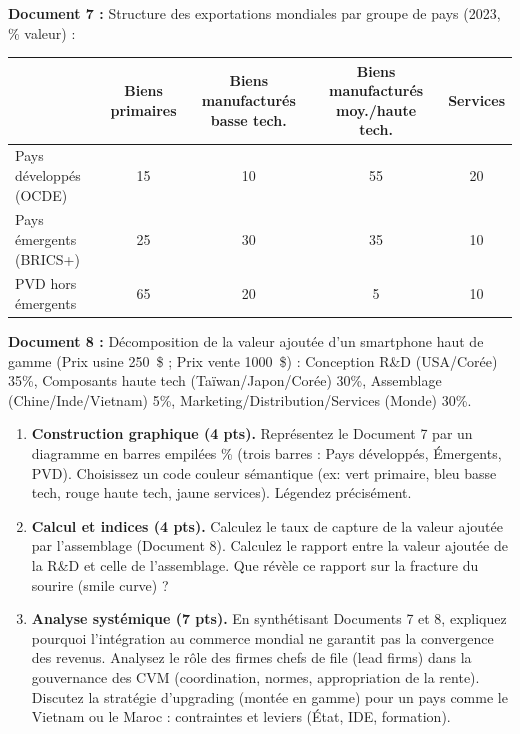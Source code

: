 \documentclass[11pt]{article}
\begin{document}
\begin{exercice}
\textbf{Document 7 :} Structure des exportations mondiales par groupe de pays (2023, \% valeur) :\\
\begin{tabular}{lcccc}
\hline
 & Biens primaires & Biens manufacturés basse tech. & Biens manufacturés moy./haute tech. & Services \\
\hline
Pays développés (OCDE) & 15 & 10 & 55 & 20 \\
Pays émergents (BRICS+) & 25 & 30 & 35 & 10 \\
PVD hors émergents & 65 & 20 & 5 & 10 \\
\hline
\end{tabular}
\textbf{Document 8 :} Décomposition de la valeur ajoutée d'un smartphone haut de gamme (Prix usine \SI{250}{\$} ; Prix vente \SI{1000}{\$}) : Conception R\&D (USA/Corée) 35\%, Composants haute tech (Taïwan/Japon/Corée) 30\%, Assemblage (Chine/Inde/Vietnam) 5\%, Marketing/Distribution/Services (Monde) 30\%.

\begin{enumerate}
    \item \textbf{Construction graphique (4 pts).} Représentez le Document 7 par un diagramme en barres empilées \% \fg (trois barres : Pays développés, Émergents, PVD). Choisissez un code couleur sémantique (ex: vert primaire, bleu basse tech, rouge haute tech, jaune services). Légendez précisément.
    \item \textbf{Calcul et indices (4 pts).} Calculez le taux de capture de la valeur ajoutée par l'assemblage (Document 8). Calculez le rapport entre la valeur ajoutée de la R\&D et celle de l'assemblage. Que révèle ce rapport sur la \og fracture du sourire \fg (smile curve) ?
    \item \textbf{Analyse systémique (7 pts).} En synthétisant Documents 7 et 8, expliquez pourquoi l'intégration au commerce mondial ne garantit pas la convergence des revenus. Analysez le rôle des \og firmes chefs de file \fg (lead firms) dans la gouvernance des CVM (coordination, normes, appropriation de la rente). Discutez la stratégie d'\og upgrading \fg (montée en gamme) pour un pays comme le Vietnam ou le Maroc : contraintes et leviers (État, IDE, formation).
\end{enumerate}
\end{exercice}
\end{document}
